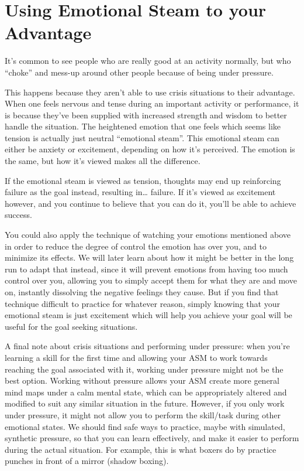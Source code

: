 \documentclass[
]{book}
\begin{document}
\hypertarget{using-emotional-steam-to-your-advantage}{%
\section{Using Emotional Steam to your Advantage}\label{using-emotional-steam-to-your-advantage}}

It's common to see people who are really good at an activity normally, but who ``choke'' and mess-up around other people because of being under pressure.

This happens because they aren't able to use crisis situations to their advantage. When one feels nervous and tense during an important activity or performance, it is because they've been supplied with increased strength and wisdom to better handle the situation. The heightened emotion that one feels which seems like tension is actually just neutral ``emotional steam''. This emotional steam can either be anxiety or excitement, depending on how it's perceived. The emotion is the same, but how it's viewed makes all the difference.

If the emotional steam is viewed as tension, thoughts may end up reinforcing failure as the goal instead, resulting in\ldots{} failure. If it's viewed as excitement however, and you continue to believe that you can do it, you'll be able to achieve success.

You could also apply the technique of watching your emotions mentioned above in order to reduce the degree of control the emotion has over you, and to minimize its effects. We will later learn about how it might be better in the long run to adapt that instead, since it will prevent emotions from having too much control over you, allowing you to simply accept them for what they are and move on, instantly dissolving the negative feelings they cause. But if you find that technique difficult to practice for whatever reason, simply knowing that your emotional steam is just excitement which will help you achieve your goal will be useful for the goal seeking situations.

A final note about crisis situations and performing under pressure: when you're learning a skill for the first time and allowing your ASM to work towards reaching the goal associated with it, working under pressure might not be the best option. Working without pressure allows your ASM create more general mind maps under a calm mental state, which can be appropriately altered and modified to suit any similar situation in the future. However, if you only work under pressure, it might not allow you to perform the skill/task during other emotional states. We should find safe ways to practice, maybe with simulated, synthetic pressure, so that you can learn effectively, and make it easier to perform during the actual situation. For example, this is what boxers do by practice punches in front of a mirror (shadow boxing).
\end{document}
